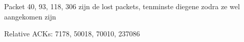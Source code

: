 Packet 40, 93, 118, 306 zijn de lost packets, tenminste diegene zodra ze wel aangekomen zijn

Relative ACKs: 7178, 50018, 70010, 237086